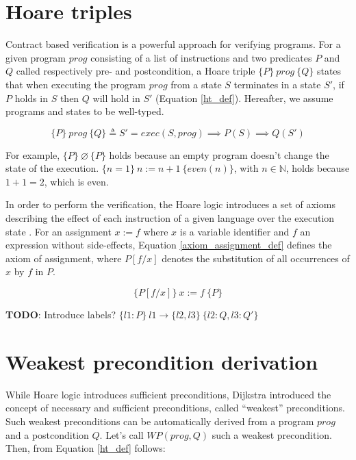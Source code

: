\documentclass{kththesis}
\newcommand{\htriple}[3]{\ensuremath{\{#1\}~#2~\{#3\}}}
\newcommand{\WP}{\ensuremath{\mathit{WP}}}
\begin{document}
\section{Hoare triples}

Contract based verification is a powerful approach for verifying programs. For a given program $prog$ consisting of a list of instructions and two predicates $P$ and $Q$ called respectively pre- and postcondition, a Hoare triple \htriple{P}{prog}{Q} states that when executing the program $prog$ from a state $S$ terminates in a state $S'$, if $P$ holds in $S$ then $Q$ will hold in $S'$ (Equation \ref{ht_def}). Hereafter, we assume programs and states to be well-typed.

\begin{equation}
  \htriple{P}{prog}{Q} \triangleq S' = exec(S, prog) \implies P(S) \implies Q(S')
  \label{ht_def}
\end{equation}

For example, \htriple{P}{\varnothing}{P} holds because an empty program doesn't change the state of the execution. \htriple{n=1}{n:=n+1}{even(n)}, with $n \in \mathbb{N}$, holds because $1+1=2$, which is even.

In order to perform the verification, the Hoare logic introduces a set of axioms describing the effect of each instruction of a given language over the execution state \cite{hoare_axiomatic_1969}. For an assignment $x:=f$ where $x$ is a variable identifier and $f$ an expression without side-effects, Equation \ref{axiom_assignment_def} defines the axiom of assignment, where $P[f/x]$ denotes the substitution of all occurrences of $x$ by $f$ in $P$.

\begin{equation}
  \htriple{P[f/x]}{x:=f}{P}
  \label{axiom_assignment_def}
\end{equation}

\textbf{TODO}: Introduce labels? \htriple{l1:P}{l1\rightarrow\{l2,l3\}}{l2:Q,l3:Q'}

\section{Weakest precondition derivation}

While Hoare logic introduces sufficient preconditions, Dijkstra introduced the concept of necessary and sufficient preconditions, called ``weakest'' preconditions. Such weakest preconditions can be automatically derived from a program $prog$ and a postcondition $Q$. Let's call $\WP(prog, Q)$ such a weakest precondition. Then, from Equation \ref{ht_def} follows:
\end{document}
